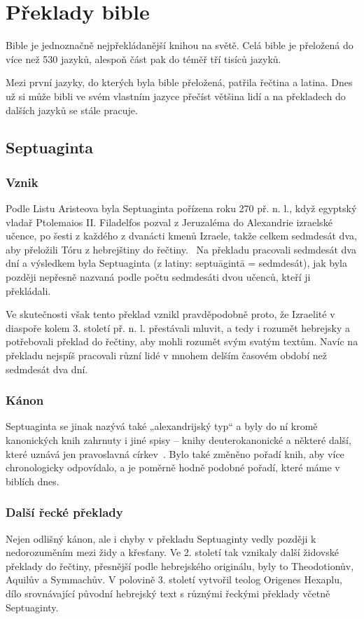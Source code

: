 \documentclass[letterpaper,12pt,oneside]{article}
\begin{document}
\section{Překlady bible}

Bible je jednoznačně nejpřekládanější knihou na světě. Celá bible je přeložená do více než 530 jazyků, alespoň část pak do téměř tří tisíců jazyků.~\cite{wycliffe}

Mezi první jazyky, do kterých byla bible přeložená, patřila řečtina a latina. Dnes už si může bibli ve svém vlastním jazyce přečíst většina lidí a na překladech do dalších jazyků se stále pracuje.

\subsection{Septuaginta}

\subsubsection{Vznik}
Podle Listu Aristeova byla Septuaginta pořízena roku 270 př. n. l., když egyptský vladař Ptolemaios II. Filadelfos pozval z Jeruzaléma do Alexandrie izraelské učence, po šesti z každého z dvanácti kmenů Izraele, takže celkem sedmdesát dva, aby přeložili Tóru z hebrejštiny do řečtiny.~\cite{LXX}  Na překladu pracovali sedmdesát dva dní a výsledkem byla Septuaginta (z latiny: septuāgintā = sedmdesát), jak byla později nepřesně nazvaná podle počtu sedmdesáti dvou učenců, kteří ji překládali.

Ve skutečnosti však tento překlad vznikl pravděpodobně proto, že Izraelité v diaspoře kolem 3. století př. n. l. přestávali mluvit, a tedy i rozumět hebrejsky a potřebovali překlad do řečtiny, aby mohli rozumět svým svatým textům. Navíc na překladu nejspíš pracovali různí lidé v mnohem delším časovém období než sedmdesát dva dní.

\subsubsection{Kánon}
Septuaginta se jinak nazývá také „alexandrijský typ“ a byly do ní kromě kanonických knih zahrnuty i jiné spisy – knihy deuterokanonické a některé další, které uznává jen pravoslavná církev~\cite{kanon}. Bylo také změněno pořadí knih, aby více chronologicky odpovídalo, a je poměrně hodně podobné pořadí, které máme v biblích dnes.

\subsubsection{Další řecké překlady}
Nejen odlišný kánon, ale i chyby v překladu Septuaginty vedly později k nedorozuměním mezi židy a křesťany. Ve 2. století tak vznikaly další židovské překlady do řečtiny, přesnější podle hebrejského originálu, byly to Theodotionův, Aquilův a Symmachův. V polovině 3. století vytvořil teolog Origenes Hexaplu, dílo srovnávající původní hebrejský text s různými řeckými překlady včetně Septuaginty.~\cite[strana 18]{cep}
\end{document}
